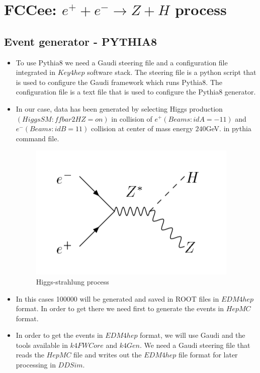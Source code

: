 \section{FCCee: $e^{+}+e^{-}\rightarrow Z+H$ process }
\subsection{Event generator - PYTHIA8}

\begin{itemize}
\item To use Pythia8 we need a Gaudi steering file and a configuration file integrated in $Key4hep$ software stack. The steering file is a python script that is used to configure the Gaudi framework which runs Pythia8. The configuration file is a text file that is used to configure the Pythia8 generator. 
  
\item In our case, data has been generated  by selecting Higgs production  $(HiggsSM:ffbar2HZ = on)$ in collision of  $e^{+}(Beams:idA = -11)$ and $e^{-}(Beams:idB = 11)$ collision at center of mass energy  $240$GeV. in pythia command file.



\begin{figure}[ht]
    \centering
    \includegraphics[scale= 0.9]{higgsprocess.png}
    \caption{Higgs-strahlung process}
    \label{fig:hsp}
\end{figure}



\item In  this cases 100000 will be generated and saved in 
ROOT files in $EDM4hep$ format. In order to get there we need 
first to generate the events in $HepMC$ format.

\item In order to get the events in $EDM4hep$ format, we will 
use Gaudi and the tools available in $k4FWCore$ and $k4Gen$. We 
need a Gaudi steering file that reads the $HepMC$ file and writes  out the $EDM4hep$ file format for later processing in $DDSim$.
\end{itemize}


